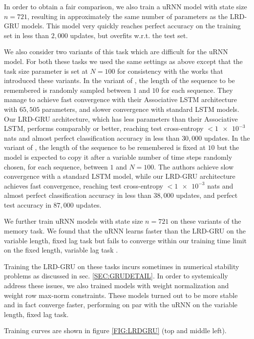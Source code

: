 \documentclass[11pt,a4paper]{article}
\begin{document}
In order to obtain a fair comparison, we also train a uRNN model with state size $n=721$, resulting in approximately the same number of parameters as the LRD-GRU models. This model very quickly reaches perfect accuracy on the training set in less than $2,000$ updates, but overfits w.r.t. the test set.

We also consider two variants of this task which are difficult for the uRNN model. For both these tasks we used the same settings as above except that the task size parameter is set at $N=100$ for consistency with the works that introduced these variants. In the variant of , the length of the sequence to be remembered is randomly sampled between $1$ and $10$ for each sequence. They manage to achieve fast convergence with their Associative LSTM architecture with $65,505$ parameters, and slower convergence with standard LSTM models. Our LRD-GRU architecture, which has less parameters than their Associative LSTM, performs comparably or better, reaching test cross-entropy $< \num{1e-3}$ nats and almost perfect classification accuracy in less than $30,000$ updates. In the variant of , the length of the sequence to be remembered is fixed at $10$ but the model is expected to copy it after a variable number of time steps randomly chosen, for each sequence, between $1$ and $N=100$. The authors achieve slow convergence with a standard LSTM model, while our LRD-GRU architecture achieves fast convergence, reaching test cross-entropy $< \num{1e-3}$ nats and almost perfect classification accuracy in less than $38,000$ updates, and perfect test accuracy in $87,000$ updates.

We further train uRNN models with state size $n=721$ on these variants of the memory task. We found that the uRNN learns faster than the LRD-GRU on the variable length, fixed lag task \cite{Danihelka2016} but fails to converge within our training time limit on the fixed length, variable lag task \cite{Henaff2016}.

Training the LRD-GRU on these tasks incurs sometimes in numerical stability problems as discussed in sec. \ref{SEC:GRUDETAIL}. In order to systemically address these issues, we also trained models with weight normalization \cite{Salimans2016} and weight row max-norm constraints. These models turned out to be more stable and in fact converge faster, performing on par with the uRNN on the variable length, fixed lag task. 

Training curves are shown in figure \ref{FIG:LRDGRU} (top and middle left).
\end{document}
